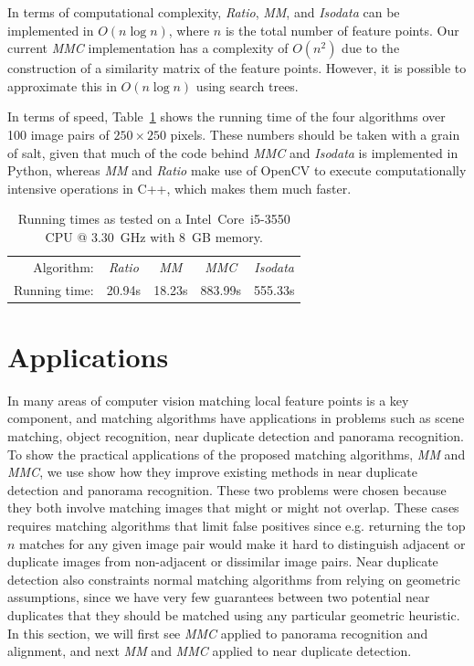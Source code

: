 \documentclass{article}
\begin{document}
In terms of computational complexity, \emph{Ratio}, \emph{MM}, and \emph{Isodata} can be 
implemented in $O(n\log n)$, where $n$ is the total number of feature 
points.  Our current \emph{MMC} implementation has a complexity of $O(n^2)$ due to the 
construction of a similarity matrix of the feature points. However, it is 
possible to approximate this in $O(n\log n)$ using search trees.  

In terms of speed, Table~\ref{table:running_times} shows the 
running time of the four algorithms over 100 image pairs of $250\!\times\!250$ pixels. 
These numbers should be taken with a grain of salt, given that 
much of the code behind \emph{MMC} and \emph{Isodata} is implemented in 
Python, whereas \emph{MM} and \emph{Ratio} make use of OpenCV to execute 
computationally intensive operations in C++, which makes them much 
faster. 

\begin{table}[htb]
\caption{Running times as tested on a Intel\textregistered\ Core\texttrademark\ i5-3550 CPU @ 
3.30~GHz with 8~GB memory.}
\label{table:running_times}
	\centering
\begin{tabular}{r*{4}{c}}
\hline
	Algorithm: & \emph{Ratio} & \emph{MM} & \emph{MMC} & \emph{Isodata} 
	\\
	\noalign{\smallskip} 
	Running time: & 20.94s & 18.23s & 883.99s & 555.33s \\
	\hline
\end{tabular}
\end{table}
%

\section{Applications}

In many areas of computer vision matching local feature points is a key 
component, and matching algorithms have applications in problems such as
scene matching, object recognition, near duplicate detection and 
panorama recognition. To show the practical applications of the proposed 
matching algorithms, \emph{MM} and \emph{MMC}, we use show how they 
improve existing methods in near duplicate detection and panorama 
recognition. These two problems were chosen because they both involve 
matching images that might or might not overlap. These cases requires 
matching algorithms that limit false positives since e.g. returning the 
top $n$ matches for any given image pair would make it hard to 
distinguish adjacent or duplicate images from non-adjacent or dissimilar
image pairs. Near duplicate detection also constraints normal matching 
algorithms from relying on geometric assumptions, since we have very few
guarantees between two potential near duplicates that they should be 
matched using any particular geometric heuristic. In this section, we 
will first see \emph{MMC} applied to panorama recognition and alignment,
and next \emph{MM} and \emph{MMC} applied to near duplicate detection.
\end{document}
